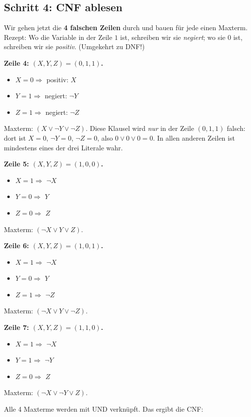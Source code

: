 \documentclass[a4paper,12pt]{article}
\begin{document}
\subsection*{Schritt 4: CNF ablesen}

Wir gehen jetzt die \textbf{4 falschen Zeilen} durch und bauen f\"ur
jede einen Maxterm. Rezept: Wo die Variable in der Zeile $1$ ist,
schreiben wir sie \emph{negiert}; wo sie $0$ ist, schreiben wir sie
\emph{positiv}. (Umgekehrt zu DNF!)

\textbf{Zeile 4: $(X,Y,Z) = (0,1,1)$.}
\begin{itemize}[nosep]
\item $X = 0 \Rightarrow$ positiv: $X$
\item $Y = 1 \Rightarrow$ negiert: $\neg Y$
\item $Z = 1 \Rightarrow$ negiert: $\neg Z$
\end{itemize}
Maxterm: $(X \vee \neg Y \vee \neg Z)$. Diese Klausel wird \emph{nur}
in der Zeile $(0,1,1)$ falsch: dort ist $X = 0$, $\neg Y = 0$,
$\neg Z = 0$, also $0 \vee 0 \vee 0 = 0$. In allen anderen Zeilen ist
mindestens eines der drei Literale wahr.

\textbf{Zeile 5: $(X,Y,Z) = (1,0,0)$.}
\begin{itemize}[nosep]
\item $X = 1 \Rightarrow$ $\neg X$
\item $Y = 0 \Rightarrow$ $Y$
\item $Z = 0 \Rightarrow$ $Z$
\end{itemize}
Maxterm: $(\neg X \vee Y \vee Z)$.

\textbf{Zeile 6: $(X,Y,Z) = (1,0,1)$.}
\begin{itemize}[nosep]
\item $X = 1 \Rightarrow$ $\neg X$
\item $Y = 0 \Rightarrow$ $Y$
\item $Z = 1 \Rightarrow$ $\neg Z$
\end{itemize}
Maxterm: $(\neg X \vee Y \vee \neg Z)$.

\textbf{Zeile 7: $(X,Y,Z) = (1,1,0)$.}
\begin{itemize}[nosep]
\item $X = 1 \Rightarrow$ $\neg X$
\item $Y = 1 \Rightarrow$ $\neg Y$
\item $Z = 0 \Rightarrow$ $Z$
\end{itemize}
Maxterm: $(\neg X \vee \neg Y \vee Z)$.

Alle 4 Maxterme werden mit UND verkn\"upft. Das ergibt die CNF:
\end{document}
